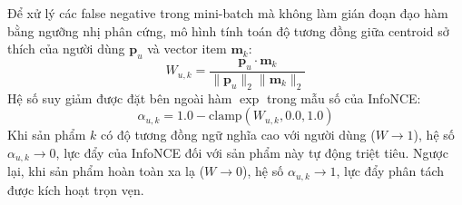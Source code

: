 Để xử lý các false negative trong mini-batch mà không làm gián đoạn đạo hàm bằng ngưỡng nhị phân cứng, mô hình tính toán độ tương đồng giữa centroid sở thích của người dùng $\mathbf{p}_u$ và vector item $\mathbf{m}_k$:
\begin{equation}
W_{u, k} = \frac{\mathbf{p}_u \cdot \mathbf{m}_k}{\|\mathbf{p}_u\|_2 \|\mathbf{m}_k\|_2}
\end{equation}
Hệ số suy giảm được đặt bên ngoài hàm $\exp$ trong mẫu số của InfoNCE:
\begin{equation}
\alpha_{u, k} = 1.0 - \text{clamp}(W_{u, k}, 0.0, 1.0)
\end{equation}
Khi sản phẩm $k$ có độ tương đồng ngữ nghĩa cao với người dùng ($W \to 1$), hệ số $\alpha_{u, k} \to 0$, lực đẩy của InfoNCE đối với sản phẩm này tự động triệt tiêu. Ngược lại, khi sản phẩm hoàn toàn xa lạ ($W \to 0$), hệ số $\alpha_{u, k} \to 1$, lực đẩy phân tách được kích hoạt trọn vẹn.

